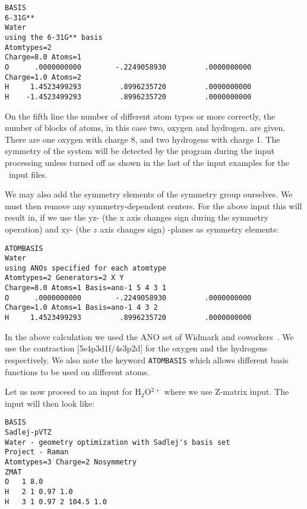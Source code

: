 \begin{verbatim}
BASIS
6-31G**
Water
using the 6-31G** basis
Atomtypes=2
Charge=8.0 Atoms=1
O      .0000000000        -.2249058930         .0000000000
Charge=1.0 Atoms=2
H     1.4523499293         .8996235720         .0000000000
H    -1.4523499293         .8996235720         .0000000000
\end{verbatim}

On the fifth line the number of different atom types or more correctly,
the number of  blocks of atoms,
in this case two, oxygen and hydrogen, are given. There are one oxygen with
charge 8, and two hydrogens with charge 1. The symmetry of the system
will be detected by the program during the input processing unless
turned off as shown in the last of the input examples for the \molinp\
input files.

We may also add the symmetry elements of the
symmetry group\index{symmetry!group} ourselves. We must
then remove any symmetry-dependent centers. For the above input this
will result in, if we use the yz- (the x axis changes sign during the
symmetry operation) and xy- (the $z$ axis changes sign) -planes as
symmetry elements: 

\begin{verbatim}
ATOMBASIS
Water
using ANOs specified for each atomtype
Atomtypes=2 Generators=2 X Y
Charge=8.0 Atoms=1 Basis=ano-1 5 4 3 1
O      .0000000000        -.2249058930         .0000000000
Charge=1.0 Atoms=1 Basis=ano-1 4 3 2
H     1.4523499293         .8996235720         .0000000000
\end{verbatim}

In the above calculation we used the ANO set of
Widmark and
coworkers~\cite{powpambortca77,powbjpbortca79}. We
use the contraction
[5s4p3d1f/4s3p2d] for the oxygen and the hydrogens respectively. We
also note the keyword \verb|ATOMBASIS|\index{ATOMBASIS} which allows
different basis functions to be used on different atoms.

Let us now proceed to an input for H$_{2}$O$^{2+}$ where we use
Z-matrix input. The  input will then look like:

\begin{verbatim}
BASIS
Sadlej-pVTZ
Water - geometry optimization with Sadlej's basis set
Project - Raman
Atomtypes=3 Charge=2 Nosymmetry
ZMAT
O   1 8.0
H   2 1 0.97 1.0
H   3 1 0.97 2 104.5 1.0
\end{verbatim}


